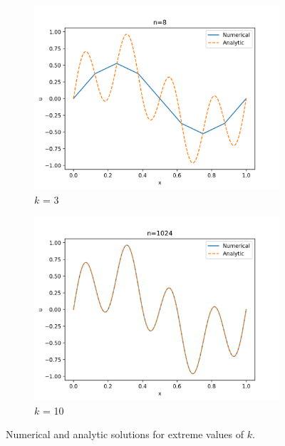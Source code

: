 \documentclass{template}
\begin{document}
\begin{figure}
    \centering
    \begin{subfigure}{0.48\textwidth}
        \includegraphics[width=\linewidth]{lowk.png}
        \caption{$k$ = 3}
        \label{}
    \end{subfigure}
    \begin{subfigure}{0.48\textwidth}
        \includegraphics[width=\linewidth]{highk.png}
        \caption{$k$ = 10}
        \label{}
    \end{subfigure}
    \caption{Numerical and analytic solutions for extreme values of $k$. }
    \label{fig:extreme-solns}
\end{figure}
\end{document}
